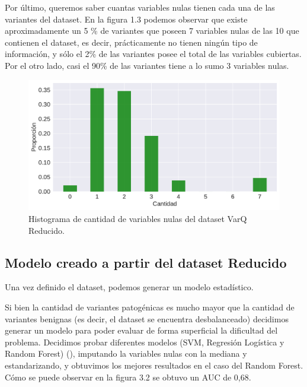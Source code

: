 Por último, queremos saber cuantas variables nulas tienen cada una de las variantes del dataset. En la figura 1.3 podemos observar que existe aproximadamente un 5 \% de variantes que poseen 7 variables nulas de las 10 que contienen el dataset, es decir, prácticamente no tienen ningún tipo de información, y sólo el 2\% de las variantes posee el total de las variables cubiertas. Por el otro lado, casi el 90\% de las variantes tiene a lo sumo 3 variables nulas.

\begin{figure}[h]
    \centering
    \includegraphics[scale=0.55]{documents/latex/figures/3/nulos_varq.pdf}
    \caption{Histograma de cantidad de variables nulas del dataset VarQ Reducido.}
    \label{fig:nulos_varq}
\end{figure}


\subsection{Modelo creado a partir del dataset Reducido}

Una vez definido el dataset, podemos generar un modelo estadístico.


Si bien la cantidad de variantes patogénicas es mucho mayor que la cantidad de variantes benignas (es decir, el dataset se encuentra desbalanceado) decidimos generar un modelo para poder evaluar de forma superficial la dificultad del problema. Decidimos probar diferentes modelos (SVM, Regresión Logística y Random Forest) (), imputando la variables nulas con la mediana y estandarizando, y obtuvimos los mejores resultados en el caso del Random Forest. Cómo se puede observar en la figura 3.2 se obtuvo un AUC de 0,68. 




